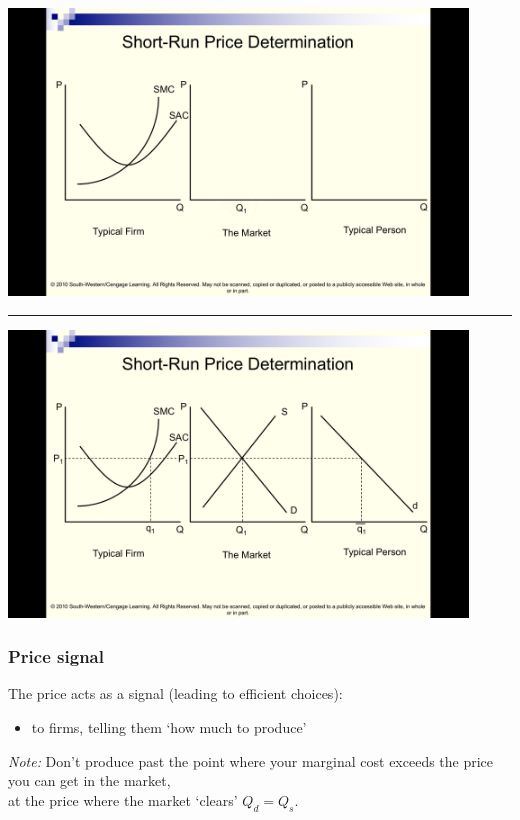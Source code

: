 \documentclass[]{article}
\providecommand{\tightlist}{%
  \setlength{\itemsep}{0pt}\setlength{\parskip}{0pt}}
\begin{document}
\includegraphics[height=3in]{picsfigs/srpd1.png}

\begin{center}\rule{0.5\linewidth}{\linethickness}\end{center}

\includegraphics[height=3in]{picsfigs/srpd6.png}

\hypertarget{price-signal}{%
\subsubsection{Price signal}\label{price-signal}}

The price acts as a signal (leading to efficient choices):

\begin{itemize}
\tightlist
\item
  to firms, telling them `how much to produce'
\end{itemize}

\emph{Note:}
Don't produce past the point where your marginal cost exceeds the price you can get in the market,\\
at the price where the market `clears' \(Q_d=Q_s\).
\end{document}

